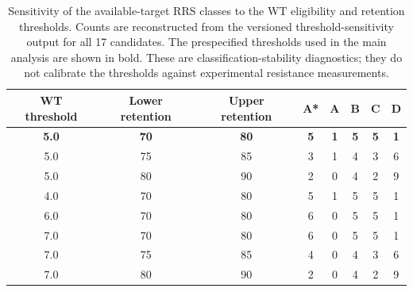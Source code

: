 \begin{table}[htbp]
\centering
\scriptsize
\caption{Sensitivity of the available-target RRS classes to the WT eligibility and retention thresholds. Counts are reconstructed from the versioned threshold-sensitivity output for all 17 candidates. The prespecified thresholds used in the main analysis are shown in bold. These are classification-stability diagnostics; they do not calibrate the thresholds against experimental resistance measurements.}
\label{tab:s11_rrs_threshold_sensitivity}
\begin{tabular}{cccccccc}
\toprule
WT threshold & Lower retention & Upper retention & A* & A & B & C & D \\
\midrule
\textbf{\num{5.0}} & \textbf{\num{70}} & \textbf{\num{80}} & \textbf{5} & \textbf{1} & \textbf{5} & \textbf{5} & \textbf{1} \\
\num{5.0} & \num{75} & \num{85} & 3 & 1 & 4 & 3 & 6 \\
\num{5.0} & \num{80} & \num{90} & 2 & 0 & 4 & 2 & 9 \\
\num{4.0} & \num{70} & \num{80} & 5 & 1 & 5 & 5 & 1 \\
\num{6.0} & \num{70} & \num{80} & 6 & 0 & 5 & 5 & 1 \\
\num{7.0} & \num{70} & \num{80} & 6 & 0 & 5 & 5 & 1 \\
\num{7.0} & \num{75} & \num{85} & 4 & 0 & 4 & 3 & 6 \\
\num{7.0} & \num{80} & \num{90} & 2 & 0 & 4 & 2 & 9 \\
\bottomrule
\end{tabular}
\end{table}
